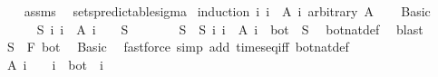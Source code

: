 \begin{isabellebody}
%
\isadelimproof
\ \ %
\endisadelimproof
%
\isatagproof
{}\isamarkupfalse%
\ assms\ \isamarkupfalse%
\ sets{\isacharunderscore}{\kern0pt}predictable{\isacharunderscore}{\kern0pt}sigma\isanewline
{}\isamarkupfalse%
\ {\isacharparenleft}{\kern0pt}induction\ {\isachardoublequoteopen}{\isacharparenleft}{\kern0pt}{\isasymUnion}i{\isachardot}{\kern0pt}\ {\isacharbraceleft}{\kern0pt}i{\isacharbraceright}{\kern0pt}\ {\isasymtimes}\ A\ i{\isacharparenright}{\kern0pt}{\isachardoublequoteclose}\ arbitrary{\isacharcolon}{\kern0pt}\ A{\isacharparenright}{\kern0pt}\isanewline
\ \ \isamarkupfalse%
\ Basic\isanewline
\ \ \isacommand{{\isacharbraceleft}{\kern0pt}}\isamarkupfalse%
\isanewline
\ \ \ \ \isamarkupfalse%
\ {\isachardoublequoteopen}{\isasymexists}S{\isachardot}{\kern0pt}\ {\isacharparenleft}{\kern0pt}{\isasymUnion}i{\isachardot}{\kern0pt}\ {\isacharbraceleft}{\kern0pt}i{\isacharbraceright}{\kern0pt}\ {\isasymtimes}\ A\ i{\isacharparenright}{\kern0pt}\ {\isacharequal}{\kern0pt}\ {\isacharbraceleft}{\kern0pt}{}{\isacharbraceright}{\kern0pt}\ {\isasymtimes}\ S{\isachardoublequoteclose}\isanewline
\ \ \ \ \isamarkupfalse%
\ \isamarkupfalse%
\ S\ \ S{\isacharcolon}{\kern0pt}\ {\isachardoublequoteopen}{\isacharparenleft}{\kern0pt}{\isasymUnion}i{\isachardot}{\kern0pt}\ {\isacharbraceleft}{\kern0pt}i{\isacharbraceright}{\kern0pt}\ {\isasymtimes}\ A\ i{\isacharparenright}{\kern0pt}\ {\isacharequal}{\kern0pt}\ {\isacharbraceleft}{\kern0pt}bot{\isacharbraceright}{\kern0pt}\ {\isasymtimes}\ S{\isachardoublequoteclose}\ \isamarkupfalse%
\ bot{\isacharunderscore}{\kern0pt}nat{\isacharunderscore}{\kern0pt}def\ \isamarkupfalse%
\ blast\isanewline
\ \ \ \ \isamarkupfalse%
\ {\isachardoublequoteopen}S\ {\isasymin}\ F\ bot{\isachardoublequoteclose}\ \isamarkupfalse%
\ Basic\ \isamarkupfalse%
\ {\isacharparenleft}{\kern0pt}fastforce\ simp\ add{\isacharcolon}{\kern0pt}\ times{\isacharunderscore}{\kern0pt}eq{\isacharunderscore}{\kern0pt}iff\ bot{\isacharunderscore}{\kern0pt}nat{\isacharunderscore}{\kern0pt}def{\isacharparenright}{\kern0pt}\isanewline
\ \ \ \ \isamarkupfalse%
\ \isamarkupfalse%
\ {\isachardoublequoteopen}A\ i\ {\isacharequal}{\kern0pt}\ {\isacharbraceleft}{\kern0pt}{\isacharbraceright}{\kern0pt}{\isachardoublequoteclose}\ \ {\isachardoublequoteopen}i\ {\isasymnoteq}\ bot{\isachardoublequoteclose}\ \ i\ \isamarkupfalse%

\end{isabellebody}
